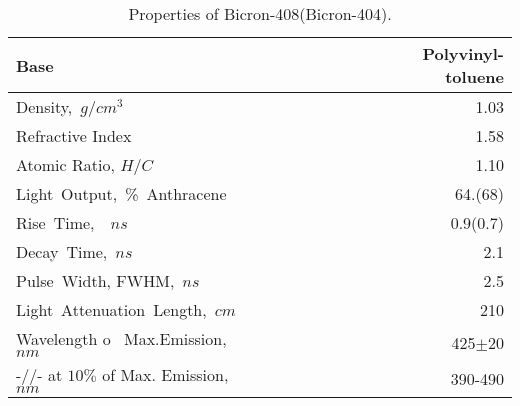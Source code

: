 \begin{table}[htbp]
\begin{center}
\begin{tabular}{|l|r|} \hline
Base& ~~~~~~~~~~~~~~~~~Polyvinyl-toluene\\ \hline
Density,~$g/cm^3$&~~~~~~~~~~~~~~~~~~~1.03\\\hline
Refractive Index&~~~~~~~~~~~~~~~~~~1.58\\\hline
Atomic Ratio, $H/C$&~~~~~~~~~~~~~~~~~1.10\\\hline
Light~Output,~\%~Anthracene &~~~~~~~~64.(68)\\\hline
Rise~Time,~~$ns$&~~~~~~~~~~~~~~~~~~~~~0.9(0.7)\\\hline
Decay~Time,~$ns$&~~~~~~~~~~~~~~~~~~~~~2.1\\\hline
Pulse~Width, FWHM,~$ns$&~~~~~~~~~~~~~~2.5\\\hline
Light~Attenuation~Length,~$cm$&~~~~~~210\\\hline
Wavelength o ~Max.Emission, $nm$  &~~~~425$\pm20$\\ \hline
-//- at   $10\%$ of Max. Emission, $nm$ & 390-490 \\ \hline
\end{tabular}
\end{center}
\caption{Properties of Bicron-408(Bicron-404).\label{b408}}
\end{table}



